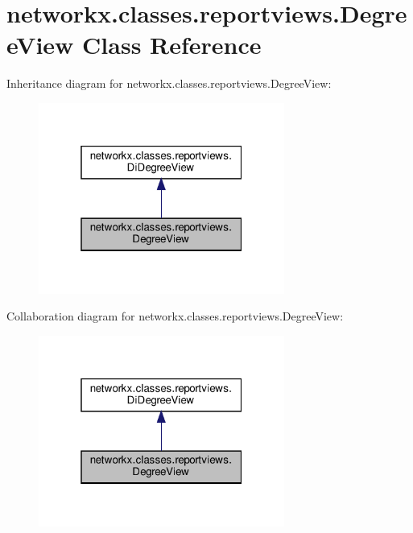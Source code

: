 \hypertarget{classnetworkx_1_1classes_1_1reportviews_1_1DegreeView}{}\section{networkx.\+classes.\+reportviews.\+Degree\+View Class Reference}
\label{classnetworkx_1_1classes_1_1reportviews_1_1DegreeView}


Inheritance diagram for networkx.\+classes.\+reportviews.\+Degree\+View\+:
\nopagebreak
\begin{figure}[H]
\begin{center}
\leavevmode
\includegraphics[width=229pt]{classnetworkx_1_1classes_1_1reportviews_1_1DegreeView__inherit__graph}
\end{center}
\end{figure}


Collaboration diagram for networkx.\+classes.\+reportviews.\+Degree\+View\+:
\nopagebreak
\begin{figure}[H]
\begin{center}
\leavevmode
\includegraphics[width=229pt]{classnetworkx_1_1classes_1_1reportviews_1_1DegreeView__coll__graph}
\end{center}
\end{figure}
